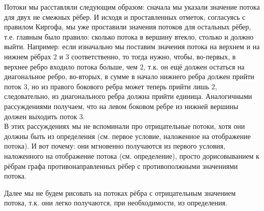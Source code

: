 Потоки мы расставляли следующим образом: сначала мы указали значение потока 
для двух не смежных рёбер. И исходя и проставленных отметок, согласуясь с 
правилом Киргофа, мы уже проставили значения потоков для остальных рёбер, т.е. 
главным было правило: сколько потока в вершину втекло, столько и должно выйти.
Например: если изначально мы поставим значения потока на верхнем и на нижнем 
рёбрах $2$ и $3$ соответственно, то тогда нужно, чтобы, во-первых, в верхнее 
ребро входило потока больше, чем $2$, т.к. он ещё должен остаться на 
диагональное ребро, во-вторых, в сумме в начало нижнего ребра должен прийти 
поток $3$, но из правого бокового ребра может теперь прийти лишь $2$, следовательно,
из диагонального ребра должна прийти единица. Аналогичными рассуждениями 
получаем, что на левом боковом ребре из нижней вершины должен выходить 
поток $3$.\\
В этих рассуждениях мы не вспоминали про отрицательные потоки, хотя они должны 
быть из определения (см. первое условие, наложенное на отображение потока).  
И вот почему: они мгновенно получаются из первого условия, наложенного на отображение потока (см. 
определение), просто дорисовыванием к рёбрам графа противонаправленных рёбер 
с противополжными значениями потока.


\begin{notice}
    Далее мы не будем рисовать на потоках рёбра с отрицательным значением потока, 
    т.к. они легко получаются, при необходимости, из определения.
\end{notice}

